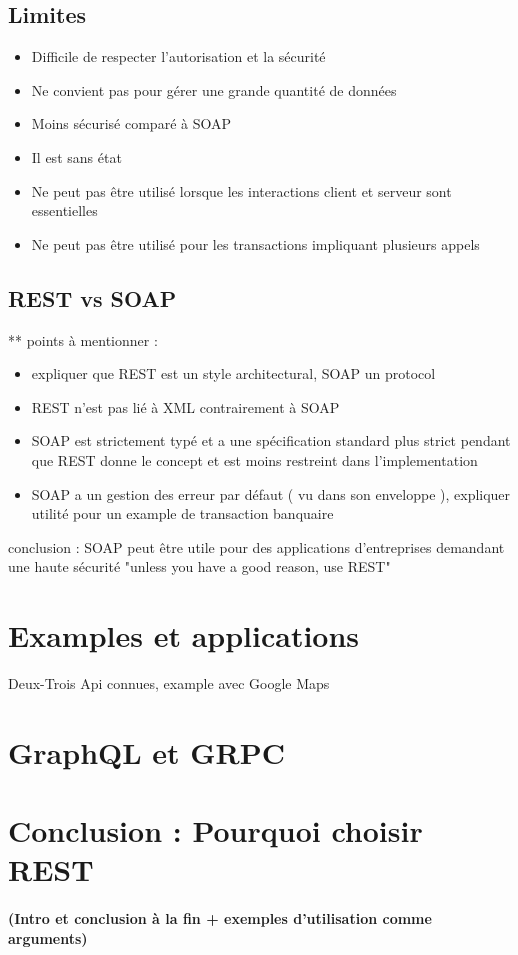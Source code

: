 			\subsection{Limites}
			\begin{itemize}
			\item Difficile de respecter l'autorisation et la sécurité
			\item Ne convient pas pour gérer une grande quantité de données
			\item Moins sécurisé comparé à SOAP
			\item Il est sans état
			\item Ne peut pas être utilisé lorsque les interactions client et serveur sont essentielles
			\item Ne peut pas être utilisé pour les transactions impliquant plusieurs appels
			\end{itemize}
			\subsection{REST vs SOAP}
			** points à mentionner : 
	\begin{itemize}
	\item expliquer que REST est un style architectural, SOAP un protocol
	\item REST n'est pas lié à XML contrairement à SOAP
	\item SOAP est strictement typé et a une spécification standard plus strict pendant que REST donne le concept et est moins restreint dans l'implementation 
	\item SOAP a un gestion des erreur par défaut ( vu dans son enveloppe ), expliquer utilité pour un example de transaction banquaire
	\end{itemize}				 
			
conclusion : SOAP peut être utile pour des applications d'entreprises demandant une haute sécurité "unless you have a good reason, use REST" 
		\section{Examples et applications}
			Deux-Trois Api connues, example avec Google Maps
		\section{GraphQL et GRPC}
			
		\section{Conclusion : Pourquoi choisir REST}
			\paragraph{(Intro et conclusion à la fin + exemples d'utilisation comme arguments)}
	